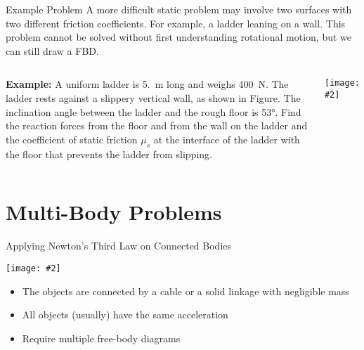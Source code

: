\documentclass[12pt,compress,aspectratio=169]{beamer}
\newcommand{\pic}[2]{\texttt{[image: \#2]}}
\begin{document}
\begin{frame}{Example Problem}
  A more difficult static problem may involve two surfaces with two different
  friction coefficients. For example, a ladder leaning on a wall. This problem
  cannot be solved without first understanding rotational motion, but we can
  still draw a FBD.
  \vspace{.2in}
  \begin{columns}
    \textbf{Example:} A uniform ladder is \SI{5.}{\metre} long and weighs
    \SI{400}{\newton}. The ladder rests against a slippery vertical wall, as
    shown in Figure. The inclination angle between the ladder and the rough
    floor is \ang{53}. Find the reaction forces from the floor and
    from the wall on the ladder and the coefficient of static friction $\mu_s$
    at the interface of the ladder with the floor that prevents the ladder from
    slipping.

    \pic{1}{graphics/ladder.png}
  \end{columns}
\end{frame}



\section{Multi-Body Problems}

\begin{frame}{Applying Newton's Third Law on Connected Bodies}
  \begin{center}
    \pic{.7}{graphics/worldslongestroadtrainwithpowertrailer8.jpg}
  \end{center}
  \begin{itemize}
  \item The objects are connected by a cable or a solid linkage with negligible
    mass
  \item All objects (usually) have the same acceleration
  \item Require multiple free-body diagrams
  \end{itemize}
\end{frame}
\end{document}
